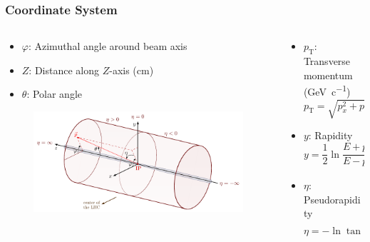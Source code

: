 \documentclass[11pt]{beamer}
\begin{document}
\begin{frame}
    \frametitle{Coordinate System}

    \begin{columns}[c]
        \begin{column}{0.6\textwidth}
            \begin{itemize}
                \item $\varphi$: Azimuthal angle around beam axis
                \item $Z$: Distance along $Z$-axis (\unit{\centi\metre})
                \item $\theta$: Polar angle
            \end{itemize}
            \begin{figure}[h]
                \begin{center}
                    \includegraphics[width=\textwidth]{Figs/coords.pdf}
                \end{center}
            \end{figure}
        \end{column}

        \begin{column}{0.4\textwidth}
            \begin{itemize}
                \item $p_{\mathrm{T}}$: Transverse momentum (\unit{\giga\electronvolt\per c})
                \begin{equation*}
                    p_{\mathrm{T}}=\sqrt{p_x^2+p_y^2}
                \end{equation*}
                \item $y$: Rapidity
                \begin{equation*}
                    y=\frac{1}{2}\ln \frac{E+p_z}{E-p_z}
                \end{equation*}
                \item $\eta$: Pseudorapidity
                \begin{equation*}
                    \eta=-\ln\tan\frac{\theta}{2}
                \end{equation*}
            \end{itemize}
        \end{column}
    \end{columns}

\end{frame}
\end{document}
